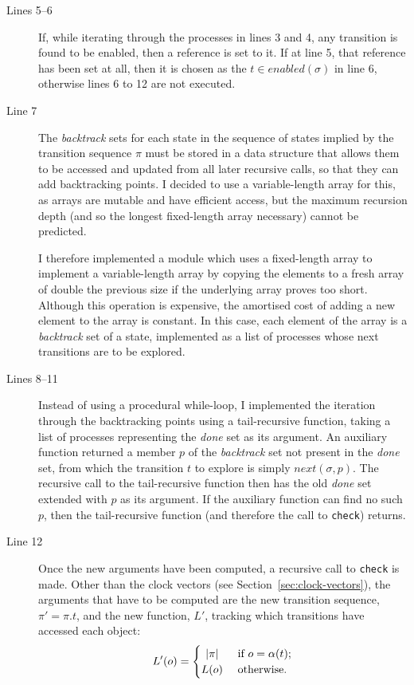 \documentclass[12pt,a4paper,twoside,openany]{report}
\begin{document}
\begin{description}
	\item[Lines 5--6] If, while iterating through the
	processes in lines 3 and 4, any transition is found to be
	enabled, then a reference is set to it. If at line 5,
	that reference has been set at all, then it is chosen
	as the $t \in \textit{enabled}(\sigma)$ in line 6,
	otherwise lines 6 to 12 are not executed.

	\item[Line 7] The \textit{backtrack} sets for each state
	in the sequence of states implied by the transition
	sequence $\pi$ must be stored in a data structure that
	allows them to be accessed and updated from all later
	recursive calls, so that they can add backtracking
	points. I decided to use a variable-length array
	for this, as arrays are mutable and have efficient
	access, but the maximum recursion depth (and so the
	longest fixed-length array necessary) cannot be predicted.
	
	I therefore implemented a module which uses a fixed-length
	array to implement a variable-length array by
	copying the elements to a fresh array of double the
	previous size if the underlying array proves too short.
	Although this operation is expensive, the amortised
	cost of adding a new element to the array is constant.
	In this case, each element of the array is a \textit{backtrack}
	set of a state, implemented as a list of processes
	whose next transitions are to be explored.
	
	\item[Lines 8--11] Instead of using a
	procedural while-loop,
	I implemented the iteration through
	the backtracking points
	using a tail-recursive
	function, taking a list of processes
	representing the \textit{done} set as
	its argument. An auxiliary
	function returned a member $p$ of the
	\textit{backtrack} set not present in the
	\textit{done} set, from which the
	transition $t$ to explore is simply
	$\textit{next}(\sigma, p)$. The
	recursive call to the tail-recursive function
	then has the old \textit{done} set
	extended with $p$ as its argument. If
	the auxiliary function can
	find no such $p$, then the
	tail-recursive function (and therefore the
	call to \texttt{check}) returns.

	\item[Line 12] Once the new arguments have
	been computed, a recursive call to
	\texttt{check} is made. Other than
	the clock vectors (see Section~\ref{sec:clock-vectors}),
	the arguments that
	have to be computed are the new transition
	sequence, $\pi' = \pi.t$,
	and the new function, $L'$,
	tracking which transitions have accessed each 
	object:
	\[ L'(o) =
	\begin{cases}
		\hfill |\pi| \hfill & \text{ if } o = \alpha(t); \\
		\hfill L(o) \hfill & \text{ otherwise}.
	\end{cases}\]


\end{description}
\end{document}
